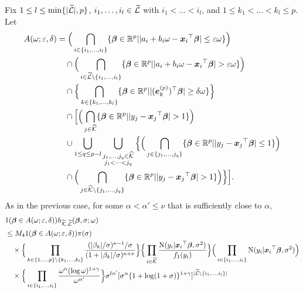 \documentclass[12pt]{article}
\def\ep{{\varepsilon}}
\def\si{{\sigma}}
\def\al{{\alpha}}
\def\be{{\beta}}
\def\ga{{\gamma}}
\def\de{{\delta}}
\def\ep{{\varepsilon}}
\def\si{{\sigma}}
\def\om{{\omega}}
\def\non{{\nonumber}}
\def\Lc{{\cal L}}
\def\Kc{{\cal K}}
\def\al{{\alpha}}
\def\be{{\beta}}
\def\ga{{\gamma}}
\def\de{{\delta}}
\def\ep{{\varepsilon}}
\def\si{{\sigma}}
\def\om{{\omega}}
\def\ka{{\kappa}}
\def\bbe{{\text{\boldmath $\beta$}}}
\def\e{{\text{\boldmath $e$}}}
\def\x{{\text{\boldmath $x$}}}
\def\Lc{{\cal L}}
\def\Kc{{\cal K}}
\def\non{{\nonumber}}
\begin{document}
Fix $1 \le l \le \min \{ | \widetilde{\Lc } |, p \} $, $i_1 , \dots , i_l \in \widetilde{\Lc }$ with $i_1 < \dots < i_l$, and $1 \le k_1 < \dots < k_l \le p$. 
Let 
\begin{align}
A( \om ; \ep , \de ) &= \Big( \bigcap_{i \in \{ i_1 , \dots , i_l \} } \{ \bbe \in \mathbb{R} ^p | | a_i + b_i \om - {\x _i}^{\top } \bbe | \le \ep \om \} \Big) \non \\
&\quad \cap \Big( \bigcap_{i \in \widetilde{\Lc } \setminus \{ i_1 , \dots , i_l \} } \{ \bbe \in \mathbb{R} ^p | | a_i + b_i \om - {\x _i}^{\top } \bbe | > \ep \om \} \Big) \non \\
&\quad \cap \Big\{ \bigcap_{k \in \{ k_1 , \dots , k_l \} } \{ \bbe \in \mathbb{R} ^p | |( \e _{k}^{(p)} )^{\top } \bbe | \ge \de \om \} \Big\} \non \\
&\quad \cap \Big[ \Big( \bigcap_{j \in \widehat{\Kc }} \{ \bbe \in \mathbb{R} ^p | | y_j - {\x _j}^{\top } \bbe | > 1 \} \Big) \non \\
&\quad \cup \bigcup_{1 \le q \le p - l} \bigcup_{\substack{j_1 , \dots , j_q \in \widehat{\Kc } \\ j_1 < \dots < j_q}} \Big\{ \Big( \bigcap_{j \in \{ j_1 , \dots , j_q \} } \{ \bbe \in \mathbb{R} ^p | | y_j - {\x _j}^{\top } \bbe | \le 1 \} \Big) \non \\
&\quad \cap \Big( \bigcap_{j \in \widehat{\Kc } \setminus \{ j_1 , \dots , j_q \} } \{ \bbe \in \mathbb{R} ^p | | y_j - {\x _j}^{\top } \bbe | > 1 \} \Big) \Big\} \Big] \text{.} \non 
\end{align}
As in the previous case, for some $\al < {\al }' \le \nu $ that is sufficiently close to $\al $, 
\begin{align}
&1( \bbe \in A( \om ; \ep , \de )) h_{\widetilde{\Kc } , \widetilde{\Lc }} ( \bbe , \si ; \om ) \non \\
&\le M_4 1( \bbe \in A( \om ; \ep , \de )) \pi ( \si ) \non \\
&\quad \times \Big\{ \prod_{k \in \{ 1, \dots , p \} \setminus \{ k_1 , \dots , k_l \} } {(| \be _k | / \si )^{\ka - 1} / \si \over (1 + | \be _k | / \si )^{\ka + \nu }} \Big\} \Big\{ \prod_{i \in \widetilde{\Kc }} {{\rm{N}} ( y_i | {\x _i}^{\top } \bbe , \si ^2 ) \over f_1 ( y_i )} \Big\} \Big( \prod_{i \in \{ i_1 , \dots , i_l \} } {\rm{N}} ( y_i | {\x _i}^{\top } \bbe , \si ^2 ) \Big) \non \\
&\quad \times \Big\{ \prod_{i \in \{ i_1 , \dots , i_l \} } {\om ^{\al } ( \log \om )^{1 + \ga } \over \om ^{{\al }'}} \Big\} \si ^{l {\al }'} [ \si ^{\al } \{ 1 + \log (1 + \si ) \} ^{1 + \ga } ]^{| \widetilde{\Lc } \setminus \{ i_1 , \dots , i_l \} |} \non 
\end{align}
\end{document}
